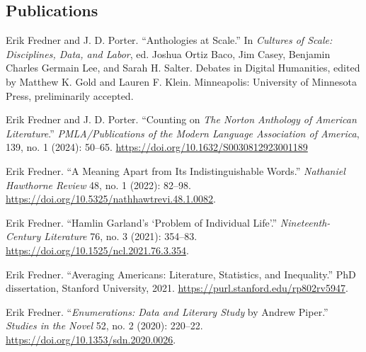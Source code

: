 \documentclass[
  12pt,
  letterpaper,
]{article}
\newlength{\cslhangindent}
\newlength{\cslentryspacingunit} %
\newenvironment{CSLReferences}[2] %
 {%
  \setlength{\parindent}{0pt}
  \ifodd #1
  \let\oldpar\par
  \def\par{\hangindent=\cslhangindent\oldpar}
  \fi
  \setlength{\parskip}{#2\cslentryspacingunit}
 }%
 {}
\begin{document}
\hypertarget{pubs}{%
\subsection{Publications}\label{pubs}}
\bigskip
\begin{CSLReferences}{1}{0}

\leavevmode{}%
Erik Fredner and J. D. Porter. {``Anthologies at Scale.''} In \emph{Cultures of Scale: Disciplines, Data, and Labor}, ed. Joshua Ortiz Baco, Jim Casey, Benjamin Charles Germain Lee, and Sarah H. Salter. Debates in Digital Humanities, edited by Matthew K. Gold and Lauren F. Klein. Minneapolis: University of Minnesota Press, preliminarily accepted.

\leavevmode{}%
Erik Fredner and J. D. Porter. {``Counting on {\emph{The Norton
Anthology of American Literature}}.''} \emph{PMLA/Publications of the Modern Language Association of America}, 139, no. 1 (2024): 50--65. \url{https://doi.org/10.1632/S0030812923001189}

\medskip

\leavevmode{}%
Erik Fredner. {``A {Meaning Apart} from {Its Indistinguishable
Words}.''} \emph{Nathaniel Hawthorne Review} 48, no. 1 (2022): 82--98.
\url{https://doi.org/10.5325/nathhawtrevi.48.1.0082}.

\medskip

\leavevmode{}%
Erik Fredner. {``Hamlin {Garland}'s {`{Problem} of {Individual Life}'}.''}
\emph{Nineteenth-Century Literature} 76, no. 3 (2021): 354--83.
\url{https://doi.org/10.1525/ncl.2021.76.3.354}.

\medskip

\leavevmode{}%
Erik Fredner. {``Averaging {Americans}: {Literature}, {Statistics}, and
{Inequality}.''} PhD dissertation, Stanford University, 2021.
\url{https://purl.stanford.edu/rp802rv5947}.

\medskip

\leavevmode{}%
Erik Fredner. {``\emph{Enumerations: {Data} and {Literary Study}} by {Andrew
Piper}.''} \emph{Studies in the Novel} 52, no. 2 (2020): 220--22.
\url{https://doi.org/10.1353/sdn.2020.0026}.

\medskip


\end{CSLReferences}
\end{document}
